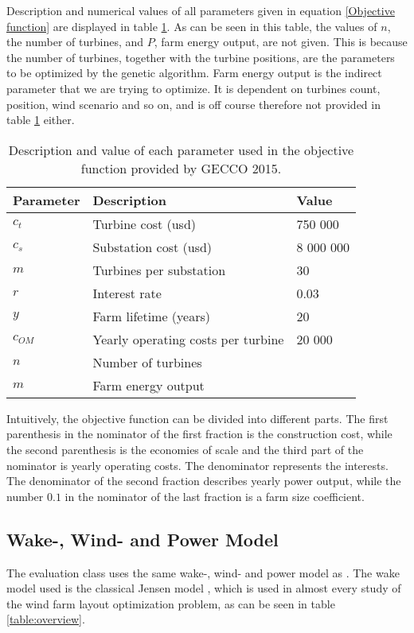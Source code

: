 \noindent Description and numerical values of all parameters given in equation \ref{Objective function} are displayed in table \ref{Parameters}. As can be seen in this table, the values of $n$, the number of turbines, and $P$, farm energy output, are not given. This is because the number of turbines, together with the turbine positions, are the parameters to be optimized by the genetic algorithm. Farm energy output is the indirect parameter that we are trying to optimize. It is dependent on turbines count, position, wind scenario and so on, and is off course therefore not provided in table \ref{Parameters} either.\\


\begin{table}[h!]
\begin{center}
\caption{Description and value of each parameter used in the objective function provided by GECCO 2015.}
\label{Parameters}
\begin{tabular}{l|l|l}
\textbf{Parameter} & \textbf{Description} & \textbf{Value} \\ 
\hline 
$c_t$ & Turbine cost (usd) & 750 000 \\ 
$c_s$ & Substation cost (usd) & 8 000 000 \\ 
$m$ & Turbines per substation & 30 \\ 
$r$ & Interest rate & 0.03 \\ 
$y$ & Farm lifetime (years) & 20 \\ 
$c_{OM}$ & Yearly operating costs per turbine & 20 000 \\ 
$n$ & Number of turbines &  \\ 
$m$ & Farm energy output &  \\  
\end{tabular} 
\end{center}
\end{table}


\noindent Intuitively, the objective function can be divided into different parts. The first parenthesis in the nominator of the first fraction is the construction cost, while the second parenthesis is the economies of scale and the third part of the nominator is yearly operating costs. The denominator represents the interests. The denominator of the second fraction describes yearly power output, while the number $0.1$ in the nominator of the last fraction is a farm size coefficient. \\



\subsection{Wake-, Wind- and Power Model}\label{subsection:wakewindpower}
The evaluation class uses the same wake-, wind- and power model as \cite{Kusiak}. The wake model used is the classical Jensen model \citep{Jensen}, which is used in almost every study of the wind farm layout optimization problem, as can be seen in table \ref{table:overview}. \\

